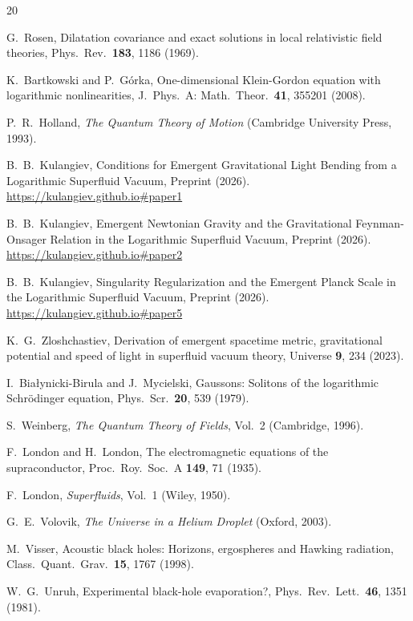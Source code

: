 \documentclass[12pt, a4paper]{article}
\begin{document}
\begin{thebibliography}{20}

G.~Rosen,
Dilatation covariance and exact solutions in local relativistic field theories,
Phys.\ Rev.\ \textbf{183}, 1186 (1969).

K.~Bartkowski and P.~G\'{o}rka,
One-dimensional Klein-Gordon equation with logarithmic nonlinearities,
J.\ Phys.\ A: Math.\ Theor.\ \textbf{41}, 355201 (2008).

P.~R.~Holland,
\emph{The Quantum Theory of Motion}
(Cambridge University Press, 1993).

B.~B.~Kulangiev,
Conditions for Emergent Gravitational Light Bending from a Logarithmic Superfluid Vacuum,
Preprint (2026).
\url{https://kulangiev.github.io#paper1}

B.~B.~Kulangiev,
Emergent Newtonian Gravity and the Gravitational Feynman-Onsager Relation in the Logarithmic Superfluid Vacuum,
Preprint (2026).
\url{https://kulangiev.github.io#paper2}

B.~B.~Kulangiev,
Singularity Regularization and the Emergent Planck Scale in the Logarithmic Superfluid Vacuum,
Preprint (2026).
\url{https://kulangiev.github.io#paper5}

K.~G.~Zloshchastiev,
Derivation of emergent spacetime metric, gravitational potential and speed of light in superfluid vacuum theory,
Universe \textbf{9}, 234 (2023).

I.~Bia{\l}ynicki-Birula and J.~Mycielski,
Gaussons: Solitons of the logarithmic Schr\"{o}dinger equation,
Phys.\ Scr.\ \textbf{20}, 539 (1979).

S.~Weinberg,
\emph{The Quantum Theory of Fields}, Vol.~2
(Cambridge, 1996).

F.~London and H.~London,
The electromagnetic equations of the supraconductor,
Proc.\ Roy.\ Soc.\ A \textbf{149}, 71 (1935).

F.~London,
\emph{Superfluids}, Vol.~1 (Wiley, 1950).

G.~E.~Volovik,
\emph{The Universe in a Helium Droplet} (Oxford, 2003).

M.~Visser,
Acoustic black holes: Horizons, ergospheres and Hawking
radiation,
Class.\ Quant.\ Grav.\ \textbf{15}, 1767 (1998).

W.~G.~Unruh,
Experimental black-hole evaporation?,
Phys.\ Rev.\ Lett.\ \textbf{46}, 1351 (1981).

\end{thebibliography}
\end{document}
